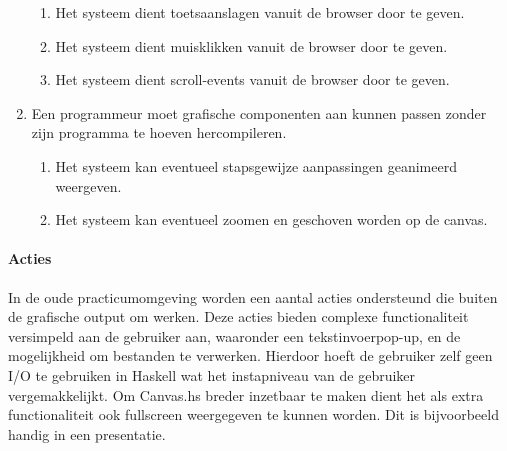 \begin{enumerate}[label={R\arabic*}]
\begin{enumerate}[label={R\arabic{enumi}.\arabic*}]
		\item \label{req:event:key} Het systeem dient toetsaanslagen vanuit de browser door te geven.
		\item \label{req:event:mouse} Het systeem dient muisklikken vanuit de browser door te geven.
		\item \label{req:event:scroll} Het systeem dient scroll-events vanuit de browser door te geven.
	\end{enumerate}
	\item Een programmeur moet grafische componenten aan kunnen passen zonder zijn programma te hoeven hercompileren.
	\begin{enumerate}[label={R\arabic{enumi}.\arabic*}]
		\item \label{req:action:animate} Het systeem kan eventueel stapsgewijze aanpassingen geanimeerd weergeven.
		\item \label{req:zoom} Het systeem kan eventueel zoomen en geschoven worden op de canvas.
	\end{enumerate}
	\setcounter{startvalue}{\value{enumi}}
\end{enumerate}

\paragraph{Acties} In de oude practicumomgeving worden een aantal acties ondersteund die buiten de grafische output om werken. Deze acties bieden complexe functionaliteit versimpeld aan de gebruiker aan, waaronder een tekstinvoerpop-up, en de mogelijkheid om bestanden te verwerken. Hierdoor hoeft de gebruiker zelf geen I/O te gebruiken in Haskell wat het instapniveau van de gebruiker vergemakkelijkt. Om Canvas.hs breder inzetbaar te maken dient het als extra functionaliteit ook fullscreen weergegeven te kunnen worden. Dit is bijvoorbeeld handig in een presentatie.

